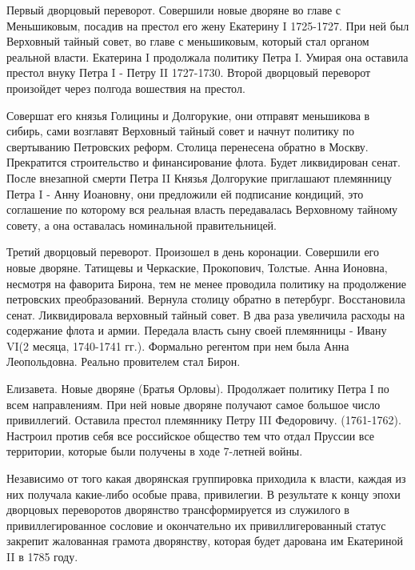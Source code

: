 \documentclass[a4paper]{article}
\begin{document}
Первый дворцовый переворот.
Совершили новые дворяне во главе с Меньшиковым, посадив на престол его жену Екатерину I 1725-1727. При ней был Верховный тайный совет, во главе с меньшиковым, который стал органом реальной власти.
Екатерина I продолжала политику Петра I. Умирая она оставила престол внуку Петра I - Петру II 1727-1730. 
Второй дворцовый переворот произойдет через полгода вошествия на престол.

Совершат его князья Голицины и Долгорукие, они отправят меньшикова в сибирь, сами возглавят Верховный тайный совет и начнут политику по свертыванию Петровских реформ. Столица перенесена обратно в Москву. Прекратится строительство и финансирование флота. Будет ликвидирован сенат.
После внезапной смерти Петра II Князья Долгорукие приглашают племянницу Петра I - Анну Иоановну, они предложили ей подписание кондиций, это соглашение по которому вся реальная власть передавалась Верховному тайному совету, а она оставалась номинальной правительницей.

Третий дворцовый переворот.
Произошел в день коронации. Совершили его новые дворяне.
Татищевы и Черкаские, Прокопович, Толстые. Анна Ионовна, несмотря на фаворита Бирона, тем не менее проводила политику на продолжение петровских преобразований. Вернула столицу обратно в петербург. Восстановила сенат. Ликвидировала верховный тайный совет.
В два раза увеличила расходы на содержание флота и армии. Передала власть сыну своей племянницы - Ивану VI(2 месяца, 1740-1741 гг.). Формально регентом при нем была Анна Леопольдовна. Реально провителем стал Бирон. 

Елизавета. Новые дворяне (Братья Орловы). Продолжает политику Петра I по всем направлениям. При ней новые дворяне получают самое большое число привиллегий. Оставила престол племяннику Петру III Федоровичу. (1761-1762). Настроил против себя все российское общество тем что отдал Пруссии все территории, которые были получены в ходе 7-летней войны.

Независимо от того какая дворянская группировка приходила к власти, каждая из них получала какие-либо особые права, привилегии. В результате к концу эпохи дворцовых переворотов дворянство трансформируется из служилого в привиллегированное сословие и окончательно их привиллигерованный статус закрепит жалованная грамота дворянству, которая будет дарована им Екатериной II в 1785 году.
\end{document}
